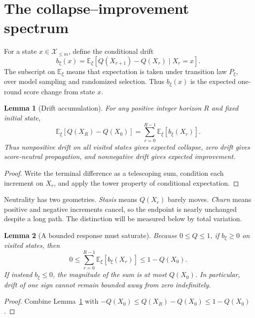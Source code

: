 \documentclass[10pt]{article}
\newtheorem{lemma}{Lemma}
\begin{document}
\section{The collapse--improvement spectrum}

For a state $x\in\mathcal X_{\le m}$, define the conditional drift
\begin{equation}\label{eq:drift}
b_\xi(x)=\mathbb E_\xi[Q(X_{r+1})-Q(X_r)\mid X_r=x].
\end{equation}
The subscript on $\mathbb E_\xi$ means that expectation is taken under transition law $P_\xi$, over model sampling and randomized selection. Thus $b_\xi(x)$ is the expected one-round score change from state $x$.

\begin{lemma}[Drift accumulation]\label{lem:drift}
For any positive integer horizon $R$ and fixed initial state,
\begin{equation}\label{eq:drift-sum}
\mathbb E_\xi[Q(X_R)-Q(X_0)]
=\sum_{r=0}^{R-1}\mathbb E_\xi[b_\xi(X_r)].
\end{equation}
Thus nonpositive drift on all visited states gives expected collapse, zero drift gives score-neutral propagation, and nonnegative drift gives expected improvement.
\end{lemma}

\begin{proof}
Write the terminal difference as a telescoping sum, condition each increment on $X_r$, and apply the tower property of conditional expectation.
\end{proof}

Neutrality has two geometries. \emph{Stasis} means $Q(X_r)$ barely moves. \emph{Churn} means positive and negative increments cancel, so the endpoint is nearly unchanged despite a long path. The distinction will be measured below by total variation.

\begin{lemma}[A bounded response must saturate]\label{lem:ceiling}
Because $0\le Q\le1$, if $b_\xi\ge0$ on visited states, then
\begin{equation}\label{eq:ceiling}
0\le\sum_{r=0}^{R-1}\mathbb E_\xi[b_\xi(X_r)]\le1-Q(X_0).
\end{equation}
If instead $b_\xi\le0$, the magnitude of the sum is at most $Q(X_0)$. In particular, drift of one sign cannot remain bounded away from zero indefinitely.
\end{lemma}

\begin{proof}
Combine Lemma~\ref{lem:drift} with $-Q(X_0)\le Q(X_R)-Q(X_0)\le1-Q(X_0)$.
\end{proof}
\end{document}
